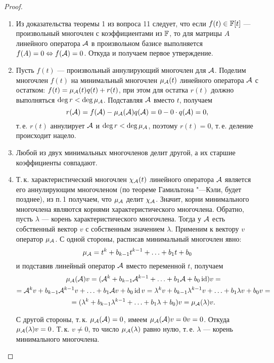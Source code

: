 \begin{proof}
    \begin{enumerate}
        \item Из доказательства теоремы 1 из вопроса 11 следует, что если $f(t) \in \mathbb{F}[t]$ --- произвольный многочлен с коэффициентами из $\mathbb{F}$, то для матрицы $A$ линейного оператора $\mathcal{A}$ в произвольном базисе выполняется $f(A) = 0 \Leftrightarrow f(\mathcal{A}) = 0$. Откуда и получаем первое утверждение.
        \item Пусть $f(t)$ --- произвольный аннулирующий многочлен для $\mathcal{A}$. Поделим многочлен $f(t)$ на минимальный многочлен $\mu_{\mathcal{A}}(t)$ линейного оператора $\mathcal{A}$ с остатком: $f(t) = \mu_{\mathcal{A}}(t)q(t) + r(t)$, при этом для остатка $r(t)$ должно выполняться $\deg r < \deg \mu_{\mathcal{A}}$. Подставляя $\mathcal{A}$ вместо $t$, получаем
            \[
                r(\mathcal{A}) = f(\mathcal{A}) - \mu_{\mathcal{A}}(\mathcal{A})q(\mathcal{A}) = 0 - 0 \cdot q(\mathcal{A}) = 0,
            \]
            т.\,е. $r(t)$ аннулирует $\mathcal{A}$ и $\deg r < \deg \mu_{\mathcal{A}}$, поэтому $r(t) = 0$, т.\,е. деление происходит нацело.
        \item Любой из двух минимальных многочленов делит другой, а их старшие коэффициенты совпадают.
        \item Т.\,к. характеристический многочлен $\chi_{\mathcal{A}}(t)$ линейного оператора $\mathcal{A}$ является его аннулирующим многочленом (по теореме Гамильтона "---Кэли, будет позднее), из п.\,1 получаем, что $\mu_{\mathcal{A}}$ делит $\chi_{\mathcal{A}}$. Значит, корни минимального многочлена являются корнями характеристического многочлена. Обратно, пусть $\lambda$ --- корень характеристического многочлена. Тогда у $\mathcal{A}$ есть собственный вектор $v$ с собственным значением $\lambda$. Применим к вектору $v$ оператор $\mu_{\mathcal{A}}$. С одной стороны, расписав минимальный многочлен явно:
            \[
                \mu_{\mathcal{A}} = t^k + b_{k - 1}t^{k - 1} + \ldots + b_1t + b_0
            \]
            и подставив линейный оператор $\mathcal{A}$ вместо переменной $t$, получаем
            \begin{multline*}
                \mu_{\mathcal{A}}(\mathcal{A})v = (\mathcal{A}^k + b_{k - 1}\mathcal{A}^{k - 1} + \ldots + b_1\mathcal{A} + b_0\operatorname{id})v =\\ = \mathcal{A}^kv + b_{k - 1}\mathcal{A}^{k - 1}v + \ldots + b_1\mathcal{A} v + b_0\operatorname{id} v = \lambda^kv + b_{k - 1}\lambda^{k - 1}v + \ldots + b_1\lambda v + b_0v =\\ = (\lambda^k + b_{k - 1}\lambda^{k - 1} + \ldots + b_1\lambda + b_0)v = \mu_{\mathcal{A}}(\lambda)v.
            \end{multline*}

            С другой стороны, т.\,к. $\mu_{\mathcal{A}}(\mathcal{A}) = 0$, имеем $\mu_{\mathcal{A}}(\mathcal{A})v = 0v = 0$. Откуда $\mu_{\mathcal{A}}(\lambda)v = 0$. Т.\,к. $v \ne 0$, то число $\mu_{\mathcal{A}}(\lambda)$ равно нулю, т.\,е. $\lambda$ --- корень минимального многочлена.
    \end{enumerate}
\end{proof}

